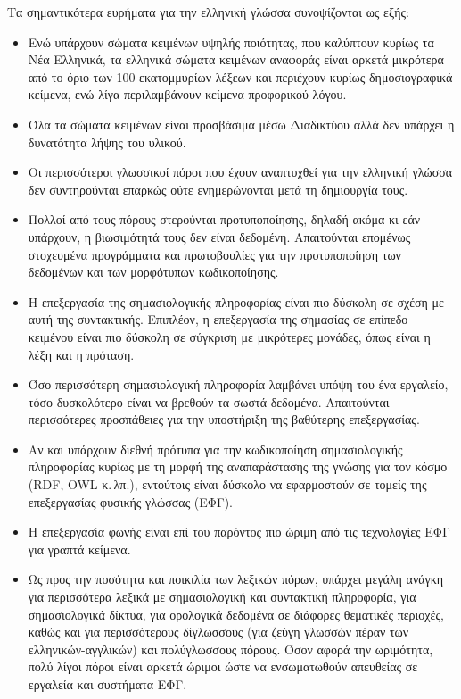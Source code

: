 \begin{multicols}{2}
Τα σημαντικότερα ευρήματα για την ελληνική γλώσσα συνοψίζονται ως εξής:

\begin{itemize}
\item Ενώ υπάρχουν σώματα κειμένων υψηλής ποιότητας, που καλύπτουν κυρίως τα Νέα Ελληνικά, τα ελληνικά σώματα κειμένων αναφοράς είναι αρκετά μικρότερα από το όριο των 100 εκατομμυρίων λέξεων και περιέχουν κυρίως δημοσιογραφικά κείμενα, ενώ λίγα περιλαμβάνουν κείμενα προφορικού λόγου.
\item Όλα τα σώματα κειμένων είναι προσβάσιμα μέσω Διαδικτύου αλλά δεν υπάρχει η δυνατότητα λήψης του υλικού.
\item Οι περισσότεροι γλωσσικοί πόροι που έχουν αναπτυχθεί για την ελληνική γλώσσα δεν συντηρούνται επαρκώς ούτε ενημερώνονται μετά τη δημιουργία τους.
\item Πολλοί από τους πόρους στερούνται προτυποποίησης, δηλαδή ακόμα κι εάν υπάρχουν, η βιωσιμότητά τους δεν είναι δεδομένη. Απαιτούνται επομένως στοχευμένα προγράμματα και πρωτοβουλίες για την προτυποποίηση των δεδομένων και των μορφότυπων κωδικοποίησης.
\item Η επεξεργασία της σημασιολογικής πληροφορίας είναι πιο δύσκολη σε σχέση με αυτή της συντακτικής. Επιπλέον, η επεξεργασία της σημασίας σε επίπεδο κειμένου είναι πιο δύσκολη σε σύγκριση με μικρότερες μονάδες, όπως είναι η λέξη και η πρόταση.
\item Όσο περισσότερη σημασιολογική πληροφορία λαμβάνει υπόψη του ένα εργαλείο, τόσο δυσκολότερο είναι να βρεθούν τα σωστά δεδομένα. Απαιτούνται περισσότερες προσπάθειες για την υποστήριξη της βαθύτερης επεξεργασίας.
\item Αν και υπάρχουν διεθνή πρότυπα για την κωδικοποίηση σημασιολογικής πληροφορίας  κυρίως με τη μορφή της αναπαράστασης της γνώσης για τον κόσμο (RDF, OWL κ.\,λπ.), εντούτοις είναι δύσκολο να εφαρμοστούν σε τομείς της επεξεργασίας φυσικής γλώσσας (ΕΦΓ).
\item Η επεξεργασία φωνής είναι επί του παρόντος πιο ώριμη από τις τεχνολογίες ΕΦΓ για γραπτά κείμενα.
\item Ως προς την ποσότητα και ποικιλία των λεξικών πόρων, υπάρχει μεγάλη ανάγκη για περισσότερα λεξικά με σημασιολογική και συντακτική πληροφορία, για σημασιολογικά δίκτυα,  για ορολογικά δεδομένα σε διάφορες θεματικές περιοχές, καθώς και για περισσότερους δίγλωσσους (για ζεύγη γλωσσών πέραν των ελληνικών-αγγλικών) και πολύγλωσσους πόρους. Όσον αφορά την ωριμότητα, πολύ λίγοι πόροι είναι αρκετά ώριμοι ώστε να ενσωματωθούν απευθείας σε εργαλεία και συστήματα ΕΦΓ.

\end{itemize}
\end{multicols}
